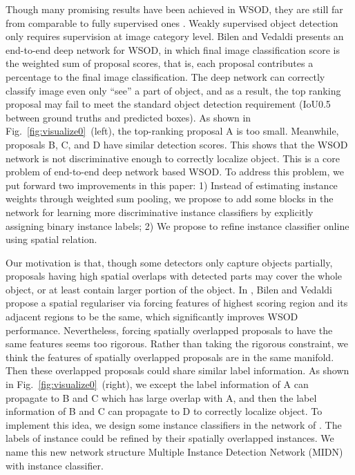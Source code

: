 \documentclass[10pt,twocolumn,letterpaper]{article}
\begin{document}
Though many promising results have been achieved in WSOD, they are still far from comparable to fully supervised ones \cite{Ref:Girshick2015,Ref:Girshick2016,Ref:Ren2015}.
Weakly supervised object detection only requires supervision at image category level. 
Bilen and Vedaldi \cite{Ref:Bilen2016} presents an end-to-end deep network for WSOD, in which final image classification score is the weighted sum of proposal scores, that is, each proposal contributes a percentage to the final image classification.
The deep network can correctly classify image even only ``see'' a part of object, and as a result, the top ranking proposal may fail to meet the standard object detection requirement (IoU0.5 between ground truths and predicted boxes).
As shown in Fig.~\ref{fig:visualize0}~(left), the top-ranking proposal A is too small.
Meanwhile, proposals B, C, and D have similar detection scores.
This shows that the WSOD network is not discriminative enough to correctly localize object.
This is a core problem of end-to-end deep network based WSOD.
To address this problem, we put forward two improvements in this paper:
1) Instead of estimating instance weights through weighted sum pooling, we propose to add some blocks in the network for learning more discriminative instance classifiers by explicitly assigning binary instance labels;
2) We propose to refine instance classifier online using spatial relation.

Our motivation is that, though some detectors only capture objects partially, proposals having high spatial overlaps with detected parts may cover the whole object, or at least contain larger portion of the object.
In \cite{Ref:Bilen2016}, Bilen and Vedaldi propose a spatial regulariser via forcing features of highest scoring region and its adjacent regions to be the same, which significantly improves WSOD performance.
Nevertheless, forcing spatially overlapped proposals to have the same features seems too rigorous.
Rather than taking the rigorous constraint, we think the features of spatially overlapped proposals are in the same manifold.
Then these overlapped proposals could share similar label information.
As shown in Fig.~\ref{fig:visualize0}~(right), we except the label information of A can propagate to B and C which has large overlap with A, and then the label information of B and C can propagate to D to correctly localize object. 
To implement this idea, we design some instance classifiers in the network of \cite{Ref:Bilen2016}. 
The labels of instance could be refined by their spatially overlapped instances.
We name this new network structure Multiple Instance Detection Network (MIDN) with instance classifier.
\end{document}
